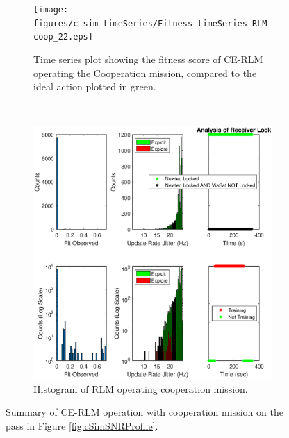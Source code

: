 \begin{figure}[ht!]
\centering
\begin{subfigure}{\linewidth}
	\centering
	\texttt{[image: figures/c\_sim\_timeSeries/Fitness\_timeSeries\_RLM\_coop\_22.eps]}
	\caption{Time series plot showing the fitness score of CE-RLM operating the Cooperation mission, compared to the ideal action plotted in green.}
	\label{fig:cSimLMOverview}
\end{subfigure}\\
\begin{subfigure}{\linewidth}
	\centering
	\includegraphics[scale=0.5]{figures/c_sim_results/sim22_RLM_hists_coop.eps}
	\caption{Histogram of RLM operating cooperation mission.}
	\label{fig:cSimLMHists}
\end{subfigure}
\caption{Summary of CE-RLM operation with cooperation mission on the pass in Figure \ref{fig:cSimSNRProfile}.}
\label{fig:c22RLMCoop}
\end{figure}
